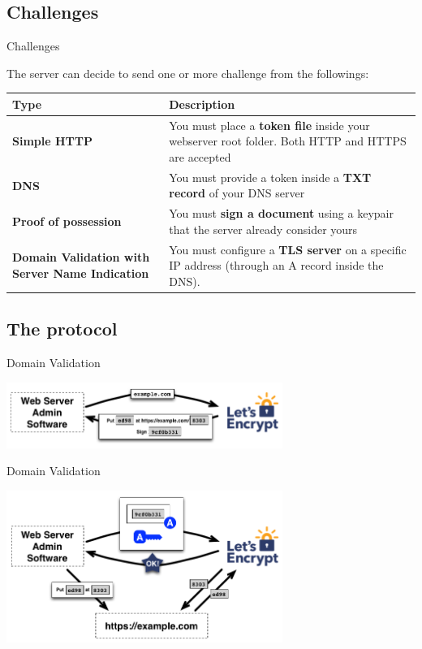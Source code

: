 \documentclass[xcolor=svgnames,11pt]{beamer}
\begin{document}
\subsection{Challenges}
\begin{frame}[fragile]{Challenges}
\begin{center}

The server can decide to send one or more challenge from the followings:
\medskip\pause

\begin{tabular}{p{3cm}p{6cm}}

\hline
\textbf{Type} & \textbf{Description} \\
\hline
\textcolor{leblue}{\textbf{\small Simple HTTP}} & \textcolor{leblue}{\small 
You must place a \textbf{token file} inside your webserver root folder.
Both HTTP and HTTPS are accepted} \\
\hline
\textbf{\small DNS} & {\small You must provide a token inside a \textbf{TXT record} of your DNS server} \\
\hline\hline
\textbf{\scriptsize Proof of possession} & {\scriptsize You must \textbf{sign a document} using a keypair that the server already consider yours} \\
\hline
\textbf{\scriptsize Domain Validation with Server Name Indication} & {\scriptsize You must configure a \textbf{TLS server} on a specific IP address (through an A record inside the DNS).} \\
\hline
\end{tabular}
\end{center}
\end{frame}

\subsection{The protocol}
\begin{frame}{Domain Validation}
\begin{center}
\includegraphics[width=9cm]{img/proto_1.png}
\end{center}
\end{frame}

\begin{frame}{Domain Validation}
\begin{center}
\includegraphics[width=9cm]{img/proto_2.png}
\end{center}
\end{frame}
\end{document}
